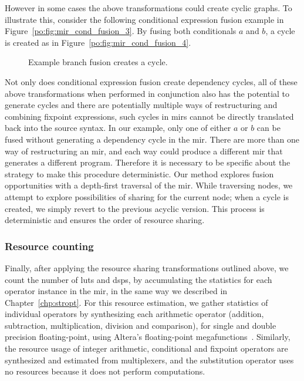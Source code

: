 However in some cases the above transformations could create cyclic graphs.  To
illustrate this, consider the following conditional expression fusion example
in Figure~\ref{po:fig:mir_cond_fusion_3}.  By fusing both conditionals $a$ and
$b$, a cycle is created as in Figure~\ref{po:fig:mir_cond_fusion_4}.
\begin{figure}[ht]
    \centering
    \quad
    \caption{Example branch fusion creates a cycle.}
\end{figure}

Not only does conditional expression fusion create dependency cycles, all
of these above transformations when performed in conjunction also has the
potential to generate cycles and there are potentially multiple ways of
restructuring and combining fixpoint expressions, such cycles in \glspl{mir}
cannot be directly translated back into the source syntax.  In our example,
only one of either $a$ or $b$ can be fused without generating a dependency
cycle in the \gls{mir}\@.  There are more than one way of restructuring an
\gls{mir}, and each way could produce a different \gls{mir} that generates a
different program.  Therefore it is necessary to be specific about the strategy
to make this procedure deterministic.  Our method explores fusion opportunities
with a depth-first traversal of the \gls{mir}\@.  While traversing nodes, we
attempt to explore possibilities of sharing for the current node; when a cycle
is created, we simply revert to the previous acyclic version.  This process is
deterministic and ensures the order of resource sharing.

\subsubsection{Resource counting}

Finally, after applying the resource sharing transformations outlined above,
we count the number of \glspl{lut} and \glspl{dsp}, by accumulating the
statistics for each operator instance in the \gls{mir}, in the same way we
described in Chapter~\ref{chp:stropt}.  For this resource estimation, we
gather statistics of individual operators by synthesizing each arithmetic
operator (addition, subtraction, multiplication, division and comparison),
for single and double precision floating-point, using Altera's floating-point
megafunctions~\cite{altfp}.  Similarly, the resource usage of integer
arithmetic, conditional and fixpoint operators are synthesized and estimated
from multiplexers, and the substitution operator uses no resources because it
does not perform computations.
